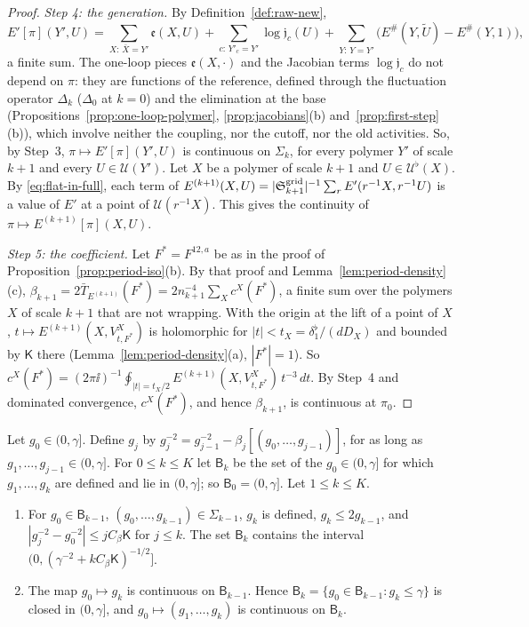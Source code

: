 \begin{proof}
\emph{Step 4: the generation.} By Definition~\ref{def:raw-new},
\[
E'[\pi](Y',U)=\sum_{X:\,\bar X=Y'}\mathfrak e(X,U)+\sum_{c:\,Y'_c=Y'}\log\mathfrak j_c(U)+\sum_{Y:\,\hat Y=Y'}\big(E^\#(Y,\tilde U)-E^\#(Y,1)\big),
\]
a finite sum. The one-loop pieces $\mathfrak e(X,\cdot)$ and the Jacobian terms $\log\mathfrak j_c$ do not depend on $\pi$: they are functions of the reference, defined through the fluctuation operator $\Delta_k$ ($\Delta_0$ at $k=0$) and the elimination at the base (Propositions~\ref{prop:one-loop-polymer}, \ref{prop:jacobians}(b) and~\ref{prop:first-step}(b)), which involve neither the coupling, nor the cutoff, nor the old activities. So, by Step~3, $\pi\mapsto E'[\pi](Y',U)$ is continuous on $\Sigma_k$, for every polymer $Y'$ of scale $k+1$ and every $U\in\mathcal U(Y')$. Let $X$ be a polymer of scale $k+1$ and $U\in\mathcal U^\flat(X)$. By \eqref{eq:flat-in-full}, each term of $E^{(k+1)}(X,U)=|\mathfrak S^{\rm grid}_{k+1}|^{-1}\sum_rE'(r^{-1}X,r^{-1}U)$ is a value of $E'$ at a point of $\mathcal U(r^{-1}X)$. This gives the continuity of $\pi\mapsto E^{(k+1)}[\pi](X,U)$.

\emph{Step 5: the coefficient.} Let $F^*=F^{12,a}$ be as in the proof of Proposition~\ref{prop:period-iso}(b). By that proof and Lemma~\ref{lem:period-density}(c), $\beta_{k+1}=2\bar T_{E^{(k+1)}}(F^*)=2n_{k+1}^{-4}\sum_Xc^X(F^*)$, a finite sum over the polymers $X$ of scale $k+1$ that are not wrapping. With the origin at the lift of a point of $X$, $t\mapsto E^{(k+1)}(X,V^X_{t,F^*})$ is holomorphic for $|t|<t_X=\delta_1^\flat/(dD_X)$ and bounded by $\mathsf K$ there (Lemma~\ref{lem:period-density}(a), $|F^*|=1$). So $c^X(F^*)=(2\pi\ii)^{-1}\oint_{|t|=t_X/2}E^{(k+1)}(X,V^X_{t,F^*})\,t^{-3}\,dt$. By Step~4 and dominated convergence, $c^X(F^*)$, and hence $\beta_{k+1}$, is continuous at $\pi_0$.
\end{proof}

\begin{corollary}\label{cor:bare-continuity}
Let $g_0\in(0,\gamma]$. Define $g_j$ by $g_j^{-2}=g_{j-1}^{-2}-\beta_j[(g_0,\dots,g_{j-1})]$, for as long as $g_1,\dots,g_{j-1}\in(0,\gamma]$. For $0\le k\le K$ let $\mathsf B_k$ be the set of the $g_0\in(0,\gamma]$ for which $g_1,\dots,g_k$ are defined and lie in $(0,\gamma]$; so $\mathsf B_0=(0,\gamma]$. Let $1\le k\le K$.
\begin{enumerate}[label=(\alph*)]
\item For $g_0\in\mathsf B_{k-1}$, $(g_0,\dots,g_{k-1})\in\Sigma_{k-1}$, $g_k$ is defined, $g_k\le2g_{k-1}$, and $|g_j^{-2}-g_0^{-2}|\le jC_\beta\mathsf K$ for $j\le k$. The set $\mathsf B_k$ contains the interval $(0,(\gamma^{-2}+kC_\beta\mathsf K)^{-1/2}]$.
\item The map $g_0\mapsto g_k$ is continuous on $\mathsf B_{k-1}$. Hence $\mathsf B_k=\{g_0\in\mathsf B_{k-1}:g_k\le\gamma\}$ is closed in $(0,\gamma]$, and $g_0\mapsto(g_1,\dots,g_k)$ is continuous on $\mathsf B_k$.
\end{enumerate}
\end{corollary}

